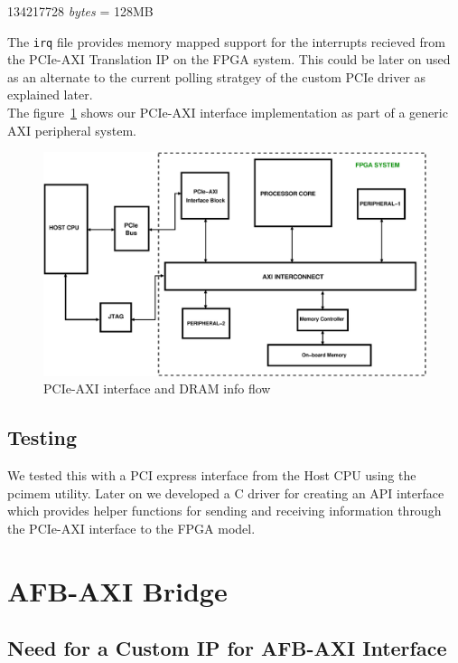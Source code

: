 \begin{flushleft}
134217728 \textit{bytes} = 128MB\\
\end{flushleft}

The \verb|irq| file provides memory mapped support for the interrupts recieved from the PCIe-AXI Translation IP on the FPGA system.
This could be later on used as an alternate to the current polling stratgey of the custom PCIe driver as explained later.\\
The figure~\ref{PCIe flow} shows our PCIe-AXI interface implementation as part of a generic AXI peripheral system.  

\begin{figure}[H]
\centering
\includegraphics[width=\textwidth]{eps_pdf_sources/ajit_fpga/DRAM_with_PCIe/DRAM_with_PCIe}
\caption{PCIe-AXI interface and DRAM info flow}
\label{PCIe flow}
\end{figure}

\subsection{Testing}

We tested this with a PCI express interface from the Host CPU using the pcimem utility. Later on we developed a C driver for creating an
API interface which provides helper functions for sending and receiving information through the PCIe-AXI interface to the FPGA model.

\section{AFB-AXI Bridge}

\subsection{Need for a Custom IP for AFB-AXI Interface}

